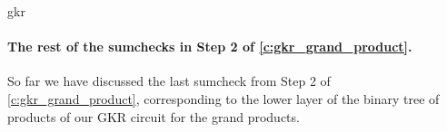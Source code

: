\begin{lncsappendix}{gkr}

\paragraph{The rest of the sumchecks in Step 2 of \cref{c:gkr_grand_product}.} So far we have discussed the last sumcheck from Step 2 of \cref{c:gkr_grand_product}, corresponding to the lower layer of the binary tree of products of our GKR circuit for the grand products. 


\end{lncsappendix}
